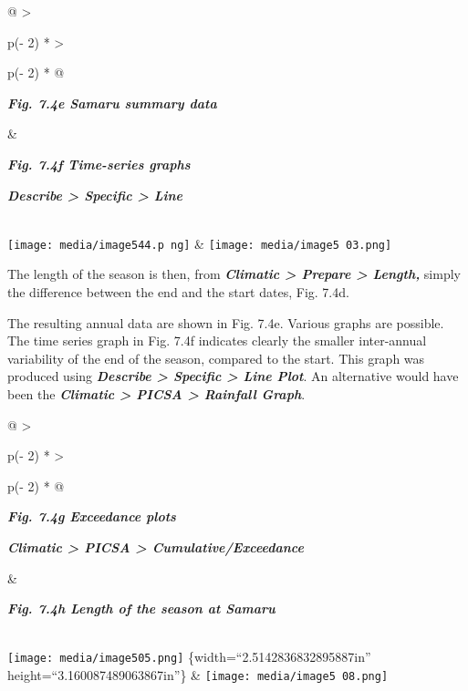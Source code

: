 \documentclass[
  letterpaper,
  DIV=11,
  numbers=noendperiod]{scrreprt}
\begin{document}
\begin{longtable}[]{@{}
  >{\raggedright\arraybackslash}p{(\columnwidth - 2\tabcolsep) * }
  >{\raggedright\arraybackslash}p{(\columnwidth - 2\tabcolsep) * }@{}}
\toprule\noalign{}
\begin{minipage}[b]{\linewidth}\raggedright
\textbf{\emph{Fig. 7.4e Samaru summary data}}
\end{minipage} & \begin{minipage}[b]{\linewidth}\raggedright
\textbf{\emph{Fig. 7.4f Time-series graphs}}

\textbf{\emph{Describe \textgreater{} Specific \textgreater{} Line}}
\end{minipage} \\
\midrule\noalign{}
\endhead
\bottomrule\noalign{}
\endlastfoot
\texttt{[image: media/image544.p ng]}
&
\texttt{[image: media/image5 03.png]} \\
\end{longtable}

The length of the season is then, from \textbf{\emph{Climatic
\textgreater{} Prepare \textgreater{} Length,}} simply the difference
between the end and the start dates, Fig. 7.4d.

The resulting annual data are shown in Fig. 7.4e. Various graphs are
possible. The time series graph in Fig. 7.4f indicates clearly the
smaller inter-annual variability of the end of the season, compared to
the start. This graph was produced using \textbf{\emph{Describe
\textgreater{} Specific \textgreater{} Line Plot}}. An alternative would
have been the \textbf{\emph{Climatic \textgreater{} PICSA \textgreater{}
Rainfall Graph}}.

\begin{longtable}[]{@{}
  >{\raggedright\arraybackslash}p{(\columnwidth - 2\tabcolsep) * }
  >{\raggedright\arraybackslash}p{(\columnwidth - 2\tabcolsep) * }@{}}
\toprule\noalign{}
\begin{minipage}[b]{\linewidth}\raggedright
\textbf{\emph{Fig. 7.4g Exceedance plots}}

\textbf{\emph{Climatic \textgreater{} PICSA \textgreater{}
Cumulative/Exceedance}}
\end{minipage} & \begin{minipage}[b]{\linewidth}\raggedright
\textbf{\emph{Fig. 7.4h Length of the season at Samaru}}
\end{minipage} \\
\midrule\noalign{}
\endhead
\bottomrule\noalign{}
\endlastfoot
\texttt{[image: media/image505.png]} \{width=``2.5142836832895887in''
height=``3.160087489063867in''\} &
\texttt{[image: media/image5 08.png]} \\
\end{longtable}
\end{document}
